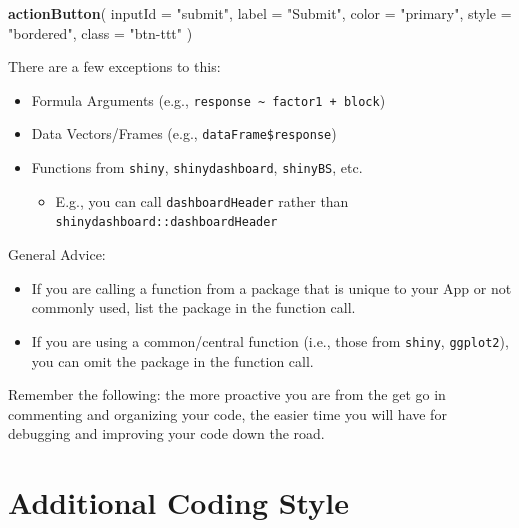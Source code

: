 \documentclass[
]{book}
\newenvironment{Shaded}{\begin{snugshade}}{\end{snugshade}}
\newcommand{\DataTypeTok}[1]{\textcolor[rgb]{0.13,0.29,0.53}{#1}}
\newcommand{\KeywordTok}[1]{\textcolor[rgb]{0.13,0.29,0.53}{\textbf{#1}}}
\newcommand{\NormalTok}[1]{#1}
\newcommand{\StringTok}[1]{\textcolor[rgb]{0.31,0.60,0.02}{#1}}
\providecommand{\tightlist}{%
  \setlength{\itemsep}{0pt}\setlength{\parskip}{0pt}}
\begin{document}
\begin{Shaded}
\begin{Highlighting}[]
\KeywordTok{actionButton}\NormalTok{(}
  \DataTypeTok{inputId =} \StringTok{"submit"}\NormalTok{,}
  \DataTypeTok{label =} \StringTok{"Submit"}\NormalTok{,}
  \DataTypeTok{color =} \StringTok{"primary"}\NormalTok{,}
  \DataTypeTok{style =} \StringTok{"bordered"}\NormalTok{,}
  \DataTypeTok{class =} \StringTok{"btn-ttt"}
\NormalTok{)}
\end{Highlighting}
\end{Shaded}

There are a few exceptions to this:

\begin{itemize}
\tightlist
\item
  Formula Arguments (e.g., \texttt{response\ \textasciitilde{}\ factor1\ +\ block})
\item
  Data Vectors/Frames (e.g., \texttt{dataFrame\$response})
\item
  Functions from \texttt{shiny}, \texttt{shinydashboard}, \texttt{shinyBS}, etc.

  \begin{itemize}
  \tightlist
  \item
    E.g., you can call \texttt{dashboardHeader} rather than \texttt{shinydashboard::dashboardHeader}
  \end{itemize}
\end{itemize}

General Advice:

\begin{itemize}
\tightlist
\item
  If you are calling a function from a package that is unique to your App or not commonly used, list the package in the function call.
\item
  If you are using a common/central function (i.e., those from \texttt{shiny}, \texttt{ggplot2}), you can omit the package in the function call.
\end{itemize}

Remember the following: the more proactive you are from the get go in commenting and organizing your code, the easier time you will have for debugging and improving your code down the road.

\hypertarget{additional-coding-style}{%
\section{Additional Coding Style}\label{additional-coding-style}}
\end{document}
